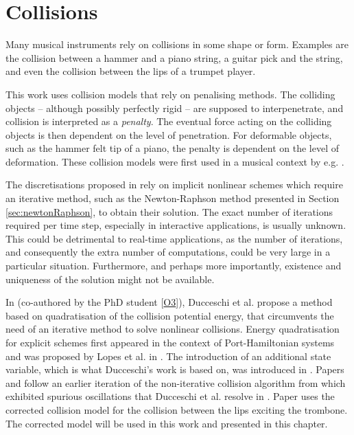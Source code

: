 \chapter{Collisions}\label{ch:collisions}
Many musical instruments rely on collisions in some shape or form. Examples are the collision between a hammer and a piano string, a guitar pick and the string, and even the collision between the lips of a trumpet player. 

This work uses collision models that rely on penalising methods. The colliding objects -- although possibly perfectly rigid -- are supposed to interpenetrate, and collision is interpreted as a \textit{penalty}. The eventual force acting on the colliding objects is then dependent on the level of penetration. For deformable objects, such as the hammer felt tip of a piano, the penalty is dependent on the level of deformation. These collision models were first used in a musical context by e.g. \cite{Chatziioannou2013, Bilbao2014}.

The discretisations proposed in \cite{Chatziioannou2013, Bilbao2014} rely on implicit nonlinear schemes which require an iterative method, such as the Newton-Raphson method presented in Section \ref{sec:newtonRaphson}, to obtain their solution. 
The exact number of iterations required per time step, especially in interactive applications, is usually unknown. This could be detrimental to real-time applications, as the number of iterations, and consequently the extra number of computations, could be very large in a particular situation. Furthermore, and perhaps more importantly, existence and uniqueness of the solution might not be available. 

In \cite{Ducceschi2021} (co-authored by the PhD student [\hyperref[ch:listOfPublications]{O3}]), Ducceschi et al. propose a method based on quadratisation of the collision potential energy, that circumvents the need of an iterative method to solve nonlinear collisions. Energy quadratisation for explicit schemes first appeared in the context of Port-Hamiltonian systems and was proposed by Lopes et al. in \cite{Lopes2015}. The introduction of an additional state variable, which is what Ducceschi's work is based on, was introduced in \cite{Yang2017, Jiang2019}. Papers \citeP[D] and \citeP[E] follow an earlier iteration of the non-iterative collision algorithm from \cite{Ducceschi2019, Bilbao2019} which exhibited spurious oscillations that Ducceschi et al. resolve in \cite{Ducceschi2021}. Paper \citeP[H] uses the corrected collision model for the collision between the lips exciting the trombone. The corrected model will be used in this work and presented in this chapter. 

